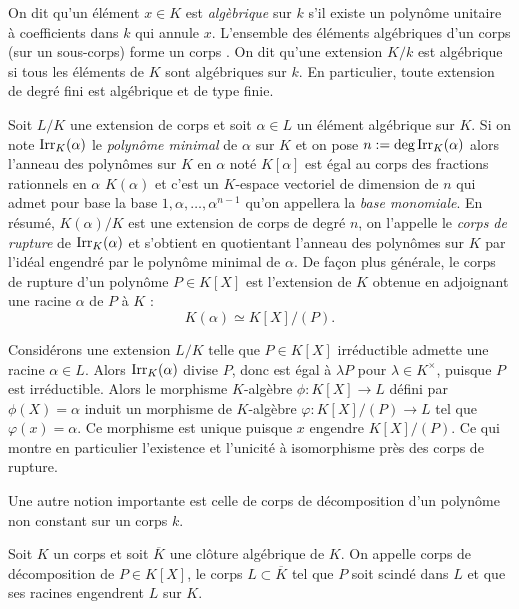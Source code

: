 \documentclass[a4paper]{article} %
\numberwithin{section}{part}
\numberwithin{equation}{section}
\newcommand\Irr[2]{\textup{Irr}_{#1}(#2)}
\begin{document}
On dit qu'un élément $x\in K$ est \emph{algèbrique} sur $k$ s'il existe un 
polynôme unitaire à coefficients dans $k$ qui annule $x$. L'ensemble des 
éléments algébriques d'un corps (sur un sous-corps) forme un corps \cite[p.~64, 
théorème 1.14]{Per}. On dit qu'une extension $K/k$ est algébrique si tous les 
éléments de $K$ sont algébriques sur $k$. En particulier, toute extension de
degré fini est algébrique et de type finie.


Soit $L/K$ une extension de corps et soit $\alpha\in L$ un élément algébrique 
sur $K$. Si on note $\Irr{K}{\alpha}$ le \emph{polynôme minimal} de $\alpha$ sur
$K$ et on pose $n := \textup{deg\,}\Irr{K}{\alpha}$ alors l'anneau des polynômes
sur $K$ en $\alpha$ noté $K[\alpha]$ est égal au corps des fractions rationnels
en $\alpha$ $K(\alpha)$ et c'est un $K$-espace vectoriel de dimension de $n$ qui
admet pour base la base $1,\alpha,\dots,\alpha^{n-1}$ qu'on appellera la 
\emph{base monomiale}. En résumé, $K(\alpha)/K$ est une extension de corps de
degré $n$, on l'appelle le \emph{corps de rupture} de $\Irr{K}{\alpha}$ et
s'obtient en quotientant l'anneau des polynômes sur $K$ par l'idéal engendré par
le polynôme minimal de $\alpha$. De façon plus générale, le corps de rupture 
d'un polynôme $P\in K[X]$ est l'extension de $K$ obtenue en adjoignant une 
racine $\alpha$ de $P$ à $K$ :
\begin{equation}
K(\alpha)\simeq K[X]/(P).
\end{equation}

Considérons une extension $L/K$ telle que $P\in K[X]$ irréductible admette une 
racine $\alpha\in L$. Alors $\Irr{K}{\alpha}$ divise $P$, donc est égal à 
$\lambda P$ pour $\lambda\in K^{\times}$, puisque $P$ est irréductible. Alors 
le morphisme $K$-algèbre $\phi : K[X] \to L$ défini par $\phi(X) = \alpha$ 
induit un morphisme de $K$-algèbre $\varphi : K[X]/(P) \to L$ tel que 
$\varphi(x) = \alpha$. Ce morphisme est unique puisque $x$ engendre $K[X]/(P)$. 
Ce qui montre en particulier l'existence et l'unicité à isomorphisme près des 
corps de rupture.\par
\vspace{0.3cm}
Une autre notion importante est celle de corps de décomposition d'un polynôme 
non constant sur un corps $k$.

\begin{defn}
\label{def:dec}
Soit $K$ un corps et soit $\overline{K}$ une clôture algébrique de $K$. On 
appelle corps de décomposition de $P\in K[X]$, le corps $L\subset\overline{K}$ 
tel que $P$ soit scindé dans $L$ et que ses racines engendrent $L$ sur $K$.
\end{defn}
\end{document}
